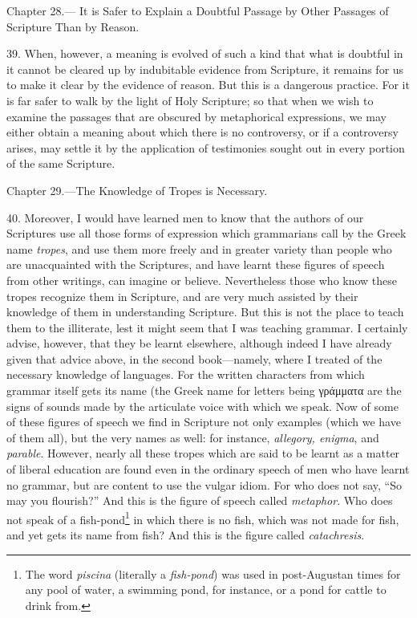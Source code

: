 
Chapter 28.— It is Safer to Explain a Doubtful Passage by Other Passages of Scripture Than by Reason.

39. When, however, a meaning is evolved of such a kind that what is doubtful in it cannot be cleared up by indubitable evidence from Scripture, it remains for us to make it clear by the evidence of reason. But this is a dangerous practice. For it is far safer to walk by the light of Holy Scripture; so that when we wish to examine the passages that are obscured by metaphorical expressions, we may either obtain a meaning about which there is no controversy, or if a controversy arises, may settle it by the application of testimonies sought out in every portion of the same Scripture.


Chapter 29.—The Knowledge of Tropes is Necessary.

40. Moreover, I would have learned men to know that the authors of our Scriptures use all those forms of expression which grammarians call by the Greek name \emph{tropes}, and use them more freely and in greater variety than people who are unacquainted with the Scriptures, and have learnt these figures of speech from other writings, can imagine or believe. Nevertheless those who know these tropes recognize them in Scripture, and are very much assisted by their knowledge of them in understanding Scripture. But this is not the place to teach them to the illiterate, lest it might seem that I was teaching grammar. I certainly advise, however, that they be learnt elsewhere, although indeed I have already given that advice above, in the second book—namely, where I treated of the necessary knowledge of languages. For the written characters from which grammar itself gets its name (the Greek name for letters being \textgreek{γράμματα} are the signs of sounds made by the articulate voice with which we speak. Now of some of these figures of speech we find in Scripture not only examples (which we have of them all), but the very names as well: for instance, \emph{allegory, enigma}, and \emph{parable}. However, nearly all these tropes which are said to be learnt as a matter of liberal education are found even in the ordinary speech of men who have learnt no grammar, but are content to use the vulgar idiom. For who does not say, “So may you flourish?” And this is the figure of speech called \emph{metaphor}. Who does not speak of a fish-pond\footnote{The word \emph{piscina} (literally a \emph{fish-pond}) was used in post-Augustan times for any pool of water, a swimming pond, for instance, or a pond for cattle to drink from.} in which there is no fish, which was not made for fish, and yet gets its name from fish? And this is the figure called \emph{ catachresis}.

